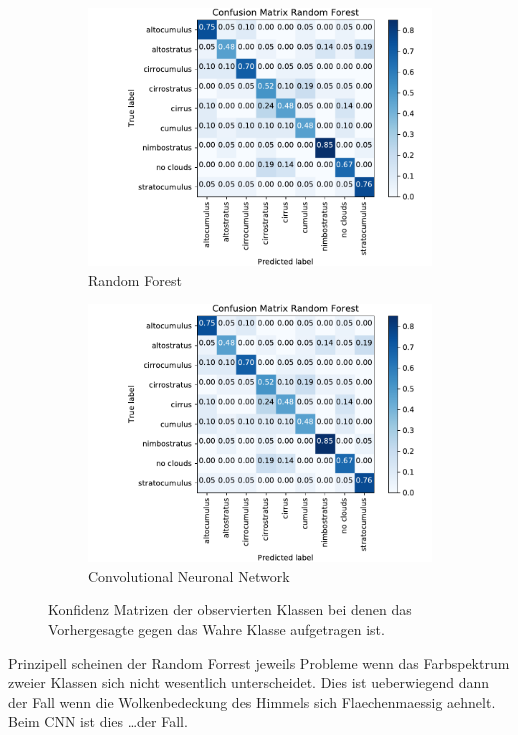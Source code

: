 \begin{figure}[h]
		\centering
		\begin{subfigure}[b]{0.49\textwidth}
				\begin{center}
						\includegraphics[width=\textwidth]{./pictures/conf_rf.pdf}
				\end{center}
				\caption{Random Forest}
				\label{fig:conf_rf}
		\end{subfigure}
		\begin{subfigure}[b]{0.49\textwidth}
				\begin{center}
						\includegraphics[width=\textwidth]{./pictures/conf_cnn.pdf}
				\end{center}
				\caption{Convolutional Neuronal Network}
				\label{fig:conf_cnn}
		\end{subfigure}
		\caption{Konfidenz Matrizen der observierten Klassen bei denen das
		Vorhergesagte gegen das Wahre Klasse aufgetragen ist.}
		\label{fig:conf}
\end{figure}
Prinzipell scheinen der Random Forrest jeweils Probleme wenn das Farbspektrum
zweier Klassen sich nicht wesentlich unterscheidet.
Dies ist ueberwiegend dann der Fall wenn die Wolkenbedeckung des Himmels sich
Flaechenmaessig aehnelt. 
Beim CNN ist dies \ldots der Fall.


